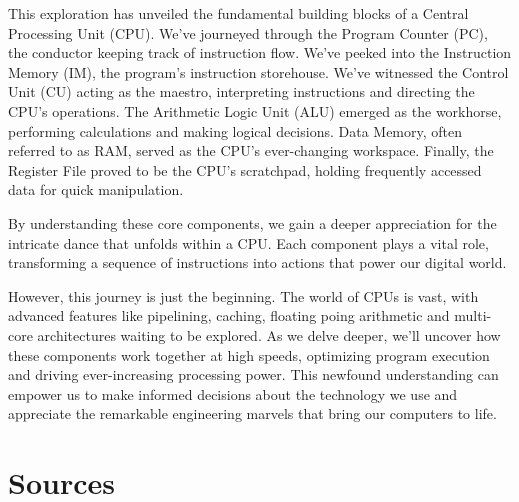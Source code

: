 \documentclass[9pt,a4paper,twoside]{tau}
\begin{document}
This exploration has unveiled the fundamental building blocks of a Central Processing Unit (CPU). We've journeyed through the Program Counter (PC), the conductor keeping track of instruction flow. We've peeked into the Instruction Memory (IM), the program's instruction storehouse. We've witnessed the Control Unit (CU) acting as the maestro, interpreting instructions and directing the CPU's operations. The Arithmetic Logic Unit (ALU) emerged as the workhorse, performing calculations and making logical decisions. Data Memory, often referred to as RAM, served as the CPU's ever-changing workspace. Finally, the Register File proved to be the CPU's scratchpad, holding frequently accessed data for quick manipulation.

By understanding these core components, we gain a deeper appreciation for the intricate dance that unfolds within a CPU. Each component plays a vital role, transforming a sequence of instructions into actions that power our digital world.

However, this journey is just the beginning. The world of CPUs is vast, with advanced features like pipelining, caching, floating poing arithmetic and multi-core architectures waiting to be explored. As we delve deeper, we'll uncover how these components work together at high speeds, optimizing program execution and driving ever-increasing processing power. This newfound understanding can empower us to make informed decisions about the technology we use and appreciate the remarkable engineering marvels that bring our computers to life.


\section{Sources}
\end{document}
